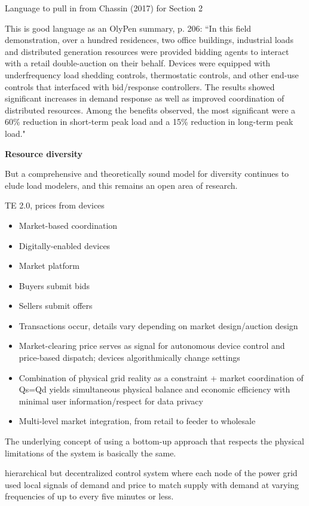 Language to pull in from Chassin (2017) for Section 2


This is good language as an OlyPen summary, p. 206: ``In this field demonstration, over a hundred residences, two office buildings, industrial loads and distributed generation resources were provided bidding agents to interact with a retail double-auction on their behalf. Devices were equipped with underfrequency load shedding controls, thermostatic controls, and other end-use controls that interfaced with bid/response controllers. The results showed significant increases in demand response as well as improved coordination of distributed resources. Among the benefits observed, the most significant were a 60\% reduction in short-term peak load and a 15\% reduction in long-term peak load."


\textbf{Resource diversity}

But a comprehensive and theoretically sound model for diversity continues to elude load modelers, and this remains an open area of research.

TE 2.0, prices from devices
\begin{itemize}
    \item Market-based coordination
    \item Digitally-enabled devices
    \item Market platform
    \item Buyers submit bids
    \item Sellers submit offers
    \item Transactions occur, details vary depending on market design/auction design
    \item Market-clearing price serves as signal for autonomous device control and price-based dispatch; devices algorithmically change settings
    \item Combination of physical grid reality as a constraint + market coordination of Qs=Qd yields simultaneous physical balance and economic efficiency with minimal user information/respect for data privacy
    \item Multi-level market integration, from retail to feeder to wholesale
\end{itemize}

The underlying concept of using a bottom-up approach that respects the physical limitations of the system is basically the same.

hierarchical but decentralized control system where each node of the power grid used local signals of demand and price to match supply with demand at varying frequencies of up to every five minutes or less.

